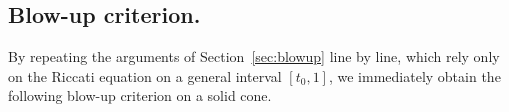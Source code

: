 \documentclass{amsart}
\newtheorem{remark}{Remark}[section]
\begin{document}


\subsection{Blow-up criterion.}
By repeating the arguments of Section~\ref{sec:blowup} line by line, which rely only on the Riccati equation on a general interval $[t_0,1]$, we immediately obtain the following blow-up criterion on a solid cone.
\end{document}
